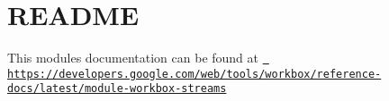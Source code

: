 \chapter{README}
\hypertarget{md_node__modules_2workbox-streams_2README}{}\label{md_node__modules_2workbox-streams_2README}
This module\textquotesingle{}s documentation can be found at \href{https://developers.google.com/web/tools/workbox/reference-docs/latest/module-workbox-streams}{\texttt{ https\+://developers.\+google.\+com/web/tools/workbox/reference-\/docs/latest/module-\/workbox-\/streams}} 